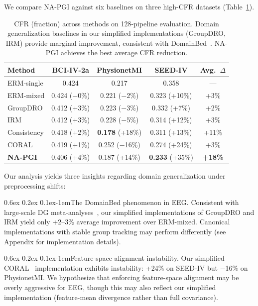 \documentclass{article}
\makeatletter
\renewcommand{\paragraph}{\@startsection{paragraph}{4}{\z@}%
  {0.6ex \@plus 0.2ex \@minus 0.1ex}{-1em}{\normalsize\bf}}
\makeatother
\begin{document}
We compare NA-PGI against six baselines on three high-CFR datasets (Table~\ref{tab:main}).

\begin{table}[t]
\centering
\caption{CFR (fraction) across methods on 128-pipeline evaluation. Domain generalization baselines in our simplified implementations (GroupDRO, IRM) provide marginal improvement, consistent with DomainBed~\citep{gulrajani2021search}. NA-PGI achieves the best average CFR reduction.}
\label{tab:main}
\small
\begin{tabular}{@{}lccc|c@{}}
\toprule
Method & BCI-IV-2a & PhysionetMI & SEED-IV & Avg.\ $\Delta$ \\
\midrule
ERM-single & 0.424 & 0.217 & 0.358 & --- \\
ERM-mixed & 0.424 ($-$0\%) & 0.221 ($-$2\%) & 0.323 (+10\%) & +3\% \\
GroupDRO & 0.412 (+3\%) & 0.223 ($-$3\%) & 0.332 (+7\%) & +2\% \\
IRM & 0.412 (+3\%) & 0.228 ($-$5\%) & 0.314 (+12\%) & +3\% \\
Consistency & 0.418 (+2\%) & \textbf{0.178} (+18\%) & 0.311 (+13\%) & +11\% \\
CORAL & 0.419 (+1\%) & 0.252 ($-$16\%) & 0.274 (+24\%) & +3\% \\
\textbf{NA-PGI} & 0.406 (+4\%) & 0.187 (+14\%) & \textbf{0.233} (+35\%) & \textbf{+18\%} \\
\bottomrule
\end{tabular}
\end{table}

Our analysis yields three insights regarding domain generalization under preprocessing shifts:

\paragraph{The DomainBed phenomenon in EEG.}
Consistent with large-scale DG meta-analyses~\citep{gulrajani2021search}, our simplified implementations of GroupDRO and IRM yield only +2--3\% average improvement over ERM-mixed. Canonical implementations with stable group tracking may perform differently (see Appendix for implementation details).

\paragraph{Feature-space alignment instability.}
Our simplified CORAL~\citep{sun2016deep} implementation exhibits instability: +24\% on SEED-IV but $-$16\% on PhysionetMI. We hypothesize that enforcing feature-space alignment may be overly aggressive for EEG, though this may also reflect our simplified implementation (feature-mean divergence rather than full covariance).
\end{document}
